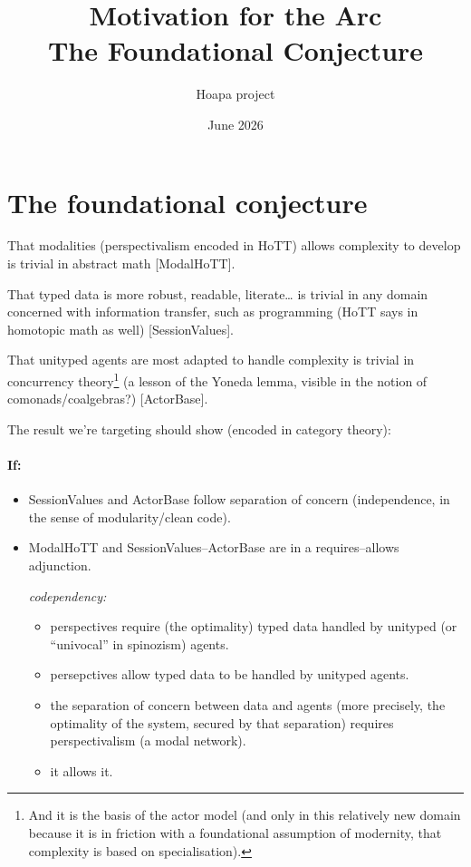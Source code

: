 \documentclass[11pt]{article}
\title{Motivation for the Arc\\[0.35em]\large The Foundational Conjecture}
\author{Hoapa project}
\date{June 2026}
\begin{document}
\maketitle

\section*{The foundational conjecture}

That modalities (perspectivalism encoded in HoTT) allows complexity to develop
is trivial in abstract math [ModalHoTT].

That typed data is more robust, readable, literate\ldots{} is trivial in any
domain concerned with information transfer, such as programming (HoTT says in
homotopic math as well) [SessionValues].

That unityped agents are most adapted to handle complexity is trivial in
concurrency theory\footnote{And it is the basis of the actor model (and only in
this relatively new domain because it is in friction with a foundational
assumption of modernity, that complexity is based on specialisation).} (a
lesson of the Yoneda lemma, visible in the notion of comonads/coalgebras?)
[ActorBase].

The result we're targeting should show (encoded in category theory):

\paragraph{If:}
\begin{itemize}
\item SessionValues and ActorBase follow separation of concern (independence,
in the sense of modularity/clean code).

\item ModalHoTT and SessionValues--ActorBase are in a requires--allows
adjunction.

\emph{codependency:}
\begin{itemize}
\item perspectives require (the optimality) typed data handled by unityped (or
``univocal'' in spinozism) agents.
\item persepctives allow typed data to be handled by unityped agents.
\item the separation of concern between data and agents (more precisely, the
optimality of the system, secured by that separation) requires
perspectivalism (a modal network).
\item it allows it.
\end{itemize}
\end{itemize}
\end{document}
